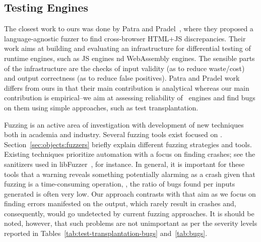 \documentclass[10pt,conference,anonymous]{IEEEtran}
\begin{document}
\subsection{Testing \js{} Engines}
\label{sec:testing-js-engines}
The closest work to ours was done by Patra and
Pradel~\cite{patra2016learning}, where they proposed a
language-agnostic fuzzer to find cross-browser HTML+JS
discrepancies. Their work aims at building and evaluating an
infrastructure for differential testing of runtime engines, such as JS
engines nd WebAssembly engines. The sensible parts of the
infrastructure are the checks of input validity (as to reduce
waste/cost) and output correctness (as to reduce false
positives). Patra and Pradel work differs from ours in that their main
contribution is analytical whereas our main contribution is
empirical--we aim at assessing reliability of \js\ engines and find
bugs on them using simple approaches, such as test transplantation.

Fuzzing is an active area of investigation with development of new
techniques both in academia and industry. Several fuzzing tools exist
focused on \js. Section~\ref{sec:objects:fuzzers} briefly explain
different fuzzing strategies and tools. Existing techniques prioritize
automation with a focus on finding crashes; see the sanitizers used in
libFuzzer~\cite{libfuzzer-tutorial}, for instance. In general, it is
important for these tools that a warning reveals something potentially
alarming as a crash given that fuzzing is a time-consuming operation,
\ie{}, the ratio of bugs found per inputs generated is often very low.
Our approach contrasts with that aim as we focus on finding errors
manifested on the output, which rarely result in crashes and,
consequently, would go undetected by current fuzzing approaches. It is
should be noted, however, that such problems are not unimportant as
per the severity levels reported in
Tables~\ref{tab:test-transplantation-bugs} and~\ref{tab:bugs}.
\end{document}
